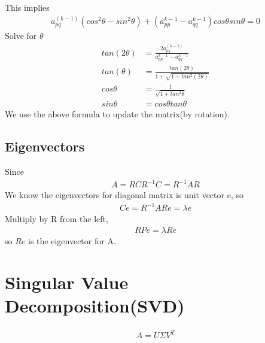 \documentclass[a4paper]{article}
\begin{document}
This implies
\begin{align*}
	a_{pq}^{(k-1)} (cos^2 \theta - sin^2 \theta) + (a_{pp}^{k-1} - a_{qq}^{k-1}) cos \theta sin \theta = 0
\end{align*}
Solve for $\theta$
\begin{align*}
	tan(2\theta) & = \frac{2 a_{pq}^{(k-1)}}{a_{pp}^{k-1} - a_{qq}^{k-1}} \\
	tan(\theta) & = \frac{tan(2 \theta)}{1 + \sqrt{1 + tan^2 (2 \theta)}} \\
	cos \theta & = \frac{1}{\sqrt{1 + tan^2 \theta}} \\
	sin \theta & = cos \theta tan \theta
\end{align*}
We use the above formula to update the matrix(by rotation). \\
\subsection{Eigenvectors}
Since 
\begin{align*}
	A = R C R^{-1}
	C = R^{-1} A R 
\end{align*}
We know the eigenvectors for diagonal matrix is unit vector e, so
\begin{align*}
	Ce = R^{-1} A R e = \lambda e
\end{align*}
Multiply by R from the left, 
\begin{align*}
	RPe = \lambda Re
\end{align*}
so $Re$ is the eigenvector for A.
\section{Singular Value Decomposition(SVD)}
\begin{align*}
	A = U \Sigma V^T
\end{align*}
\end{document}
